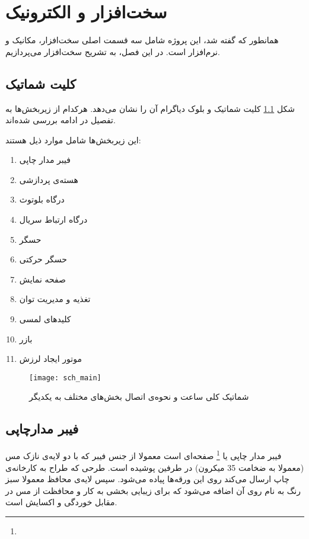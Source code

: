 \chapter{سخت‌افزار و الکترونیک} \label{chap:hardware}

همانطور که گفته شد، این پروژه شامل سه قسمت اصلی سخت‌افزار، مکانیک و نرم‌افزار است. در این فصل، به تشریح سخت‌افزار می‌پردازیم.

\section{کلیت شماتیک}
شکل \ref{fig:sch-all} کلیت شماتیک و بلوک دیاگرام آن را نشان می‌دهد. هرکدام از زیربخش‌ها به تفصیل در ادامه بررسی شده‌اند.

این زیربخش‌ها شامل موارد ذیل هستند:
\begin{multicols}{2}
\begin{enumerate}
	\item فیبر مدار چاپی
	\item هسته‌ی پردازشی
	\item درگاه بلوتوث
	\item درگاه ارتباط سریال
	\item حسگر 
	\item حسگر حرکتی
	\item صفحه نمایش
	\item تغذیه و مدیریت توان
	\item کلیدهای لمسی
	\item بازر
	\item موتور ایجاد لرزش
\end{enumerate}
\end{multicols}


\begin{figure}[h]
	\centering
	\texttt{[image: sch\_main]}
	\caption{شماتیک کلی ساعت و نحوه‌ی اتصال بخش‌های مختلف به یکدیگر}
	\label{fig:sch-all}
\end{figure}
\section{فیبر مدارچاپی}
	فیبر مدار چاپی یا \pcb\footnote{} صفحه‌ای است معمولا از جنس فیبر  که با دو لایه‌ی نازک مس (معمولا به ضخامت 35 میکرون) در طرفین پوشیده است. طرحی که طراح به کارخانه‌ی چاپ \pcbf ارسال می‌کند روی این ورقه‌ها پیاده می‌شود. سپس لایه‌ی محافظ معمولا سبز رنگ به نام  روی آن اضافه می‌شود که برای زیبایی بخشی به کار و محافظت از مس در مقابل خوردگی و اکسایش است.
	
